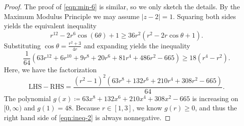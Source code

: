 \documentclass[10pt,a4paper]{amsart}
\begin{document}
\begin{proof}
	The proof of \eqref{eqn:min-6} is similar, so we only sketch the details.  By the Maximum Modulus Principle we may assume $|z-2| = 1$.  Squaring both sides yields the equivalent inequality
	\begin{equation}\label{eqn:polar-coord-2}
		r^{12} - 2r^6\cos(6\theta) + 1 \geq 36r^2(r^2 - 2r\cos\theta + 1).
	\end{equation}
	Substituting $\cos \theta = \tfrac{r^2+3}{4r}$ and expanding yields the inequality
	\[
	\frac{1}{64} \left(63 r^{12}+6 r^{10}+9 r^8+20 r^6+81 r^4+486 r^2-665\right) \geq 18(r^4 - r^2).
	\] 
	Here, we have the factorization
	\begin{equation}\label{eqn:ineq-2}
		\text{LHS} - \text{RHS} =  \frac{(r^2-1)^2(63r^8+132r^6+210r^4+308r^2-665)}{64}.
	\end{equation}
	The polynomial $g(x)\coloneqq  63x^8+132x^6+210x^4+308x^2-665$ is increasing on $[0,\infty)$ and $g(1) = 48$.  Because $r\in[1,3]$, we know $g(r) \geq 0$, and thus the right hand side of \eqref{eqn:ineq-2} is always nonnegative.
\end{proof}
\end{document}
